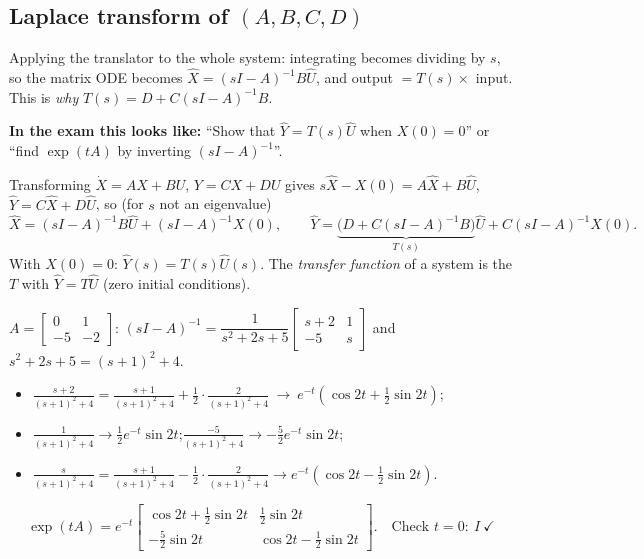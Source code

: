 \subsection{Laplace transform of \texorpdfstring{$(A,B,C,D)$}{(A,B,C,D)} \texorpdfstring{}{}}\label{sec:lapabcd}\label{ss:3-7}
\begin{plainbox}
Applying the translator to the whole system: integrating becomes dividing by $s$, so the matrix ODE becomes
$\hat X=(sI-A)^{-1}B\hat U$, and output $=T(s)\times$ input. This is \emph{why} $T(s)=D+C(sI-A)^{-1}B$.
\par\smallskip\textbf{In the exam this looks like:} ``Show that $\hat Y=T(s)\hat U$ when $X(0)=0$'' or ``find $\exp(tA)$ by inverting $(sI-A)^{-1}$''.
\end{plainbox}
\begin{thmbox}[title={Theorem 0.31}]
Transforming $\dot X=AX+BU$, $Y=CX+DU$ gives $s\hat X-X(0)=A\hat X+B\hat U$, $\hat Y=C\hat X+D\hat U$, so (for $s$ not an eigenvalue)
\[\hat X=(sI-A)^{-1}B\hat U+(sI-A)^{-1}X(0),\qquad \hat Y=\underbrace{\big(D+C(sI-A)^{-1}B\big)}_{T(s)}\hat U+C(sI-A)^{-1}X(0).\]
With $X(0)=0$: $\boxed{\hat Y(s)=T(s)\hat U(s)}$. The \emph{transfer function} of a system is the $T$ with $\hat Y=T\hat U$ (zero initial conditions).
\end{thmbox}
\begin{workbox}[title={Worked example: $\exp(tA)$ by Laplace, complex eigenvalues}]
$A=\begin{bmatrix}0&1\\-5&-2\end{bmatrix}$: $(sI-A)^{-1}=\dfrac{1}{s^2+2s+5}\begin{bmatrix}s+2&1\\-5&s\end{bmatrix}$ and $s^2+2s+5=(s+1)^2+4$.
\begin{itemize}
\item $\frac{s+2}{(s+1)^2+4}=\frac{s+1}{(s+1)^2+4}+\frac12\cdot\frac{2}{(s+1)^2+4}\ \to\ e^{-t}(\cos2t+\tfrac12\sin2t)$;
\item $\frac{1}{(s+1)^2+4}\to\frac12e^{-t}\sin2t$;\quad $\frac{-5}{(s+1)^2+4}\to-\frac52e^{-t}\sin2t$;
\item $\frac{s}{(s+1)^2+4}=\frac{s+1}{(s+1)^2+4}-\frac12\cdot\frac{2}{(s+1)^2+4}\to e^{-t}(\cos2t-\tfrac12\sin2t)$.
\end{itemize}
\[\exp(tA)=e^{-t}\begin{bmatrix}\cos2t+\frac12\sin2t&\frac12\sin2t\\-\frac52\sin2t&\cos2t-\frac12\sin2t\end{bmatrix}.\quad\text{Check }t=0:\ I\ \checkmark\]
\end{workbox}

